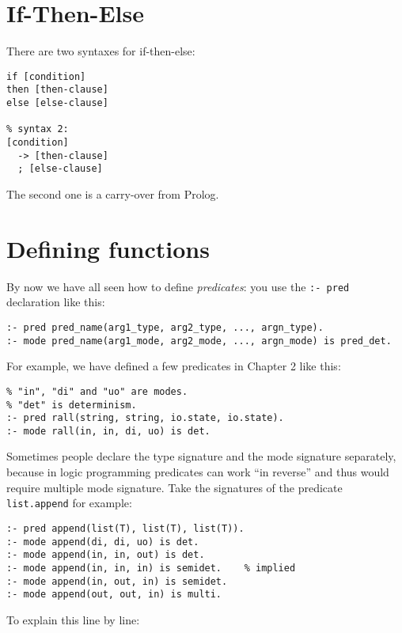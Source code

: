 \section{If-Then-Else}

There are two syntaxes for if-then-else:

\begin{lstlisting}[language=Mercury]
% syntax 1:
if [condition]
then [then-clause]
else [else-clause]

% syntax 2:
[condition]
  -> [then-clause]
  ; [else-clause]
\end{lstlisting}

The second one is a carry-over from Prolog.

\section{Defining functions}

By now we have all seen how to define \textit{predicates}: you use the \texttt{:- pred} declaration like this:

\begin{lstlisting}
:- pred pred_name(arg1_type, arg2_type, ..., argn_type).
:- mode pred_name(arg1_mode, arg2_mode, ..., argn_mode) is pred_det.
\end{lstlisting}

For example, we have defined a few predicates in Chapter 2 like this:

\begin{lstlisting}[language=Mercury]
% "string" and "io.state" are types.
% "in", "di" and "uo" are modes.
% "det" is determinism.
:- pred rall(string, string, io.state, io.state).
:- mode rall(in, in, di, uo) is det.
\end{lstlisting}

Sometimes people declare the type signature and the mode signature separately, because in logic programming predicates can work ``in reverse'' and thus would require multiple mode signature. Take the signatures of the predicate \texttt{list.append} for example:

\begin{lstlisting}[language=Mercury]
:- pred append(list(T), list(T), list(T)).
:- mode append(di, di, uo) is det.
:- mode append(in, in, out) is det.
:- mode append(in, in, in) is semidet.    % implied
:- mode append(in, out, in) is semidet.
:- mode append(out, out, in) is multi.
\end{lstlisting}

To explain this line by line:

